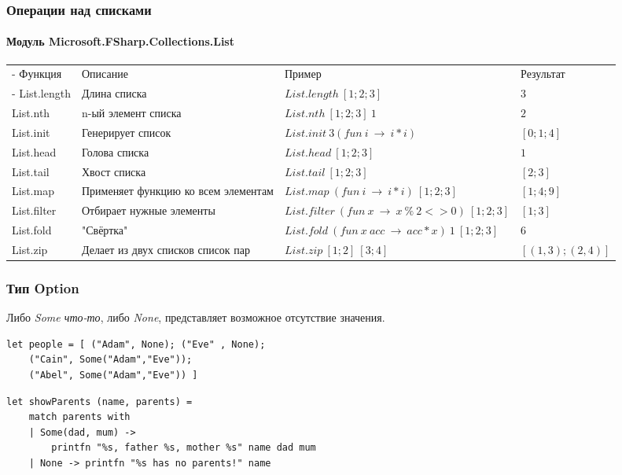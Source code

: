 \documentclass[xetex,mathserif,serif]{beamer}
\begin{document}
	\begin{frame}
		\frametitle{Операции над списками}
		\framesubtitle{Модуль Microsoft.FSharp.Collections.List}
		\begin{scriptsize}
			\begin{tabu} {| X[0.5 l p] | X[1 l p] | X[1 l p] | X[0.5 l p] |}
				\tabucline-
				Функция                & Описание                            & Пример                                              & Результат                        \\
				\tabucline-
				\everyrow{\tabucline-}
				List.length            & Длина списка                        & $List.length\ [1;2;3]$                              & $3$          \\
				List.nth               & n-ый элемент списка                 & $List.nth\ [1; 2; 3]\ 1$                            & $2$          \\
				List.init              & Генерирует список                   & $List.init\ 3 (fun\ i\ \rightarrow\ i * i)$         & $[0; 1; 4]$          \\
				List.head              & Голова списка                       & $List.head\ [1; 2; 3]$                              & $1$          \\
				List.tail              & Хвост списка                        & $List.tail\ [1; 2; 3]$                              & $[2; 3]$          \\
				List.map               & Применяет функцию ко всем элементам & $List.map\ (fun\ i\ \rightarrow\ i * i)\ [1; 2; 3]$ & $[1; 4; 9]$          \\
				List.filter            & Отбирает нужные элементы            & $List.filter\ (fun\ x\ \rightarrow\ x\ \%\ 2 <> 0)\ [1; 2; 3]$ & $[1; 3]$          \\
				List.fold              & "Свёртка"  & $List.fold\ (fun\ x\ acc\ \rightarrow\ acc * x)\ 1\ [1; 2; 3]$               & $6$          \\
				List.zip               & Делает из двух списков список пар   & $List.zip\ [1; 2]\ [3; 4]$                          & $[(1, 3); (2, 4)]$          \\
			\end{tabu}
		\end{scriptsize}
	\end{frame}
	
	\begin{frame}[fragile]
		\frametitle{Тип Option}
		Либо \textit{Some что-то}, либо \textit{None}, представляет возможное отсутствие значения.
		\begin{verbatim}
let people = [ ("Adam", None); ("Eve" , None);
    ("Cain", Some("Adam","Eve"));
    ("Abel", Some("Adam","Eve")) ]
		\end{verbatim}
		\begin{verbatim}
let showParents (name, parents) =
    match parents with
    | Some(dad, mum) -> 
        printfn "%s, father %s, mother %s" name dad mum
    | None -> printfn "%s has no parents!" name
		\end{verbatim}
\end{frame}
\end{document}
